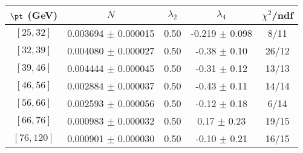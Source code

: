 \begin{tabular}{c||c|c|c|c}
$\pt$ (GeV) & $N$ & $\lambda_{2}$ & $\lambda_4$  & $\chi^2$/ndf  \\
\hline
$[25, 32]$ & 0.003694 $\pm$ 0.000015 & 0.50 & -0.219 $\pm$ 0.098 & 8/11\\
$[32, 39]$ & 0.004080 $\pm$ 0.000027 & 0.50 & -0.38 $\pm$ 0.10 & 26/12\\
$[39, 46]$ & 0.004444 $\pm$ 0.000045 & 0.50 & -0.31 $\pm$ 0.12 & 13/13\\
$[46, 56]$ & 0.002884 $\pm$ 0.000037 & 0.50 & -0.43 $\pm$ 0.11 & 14/14\\
$[56, 66]$ & 0.002593 $\pm$ 0.000056 & 0.50 & -0.12 $\pm$ 0.18 & 6/14\\
$[66, 76]$ & 0.000983 $\pm$ 0.000032 & 0.50 & 0.17 $\pm$ 0.23 & 19/15\\
$[76, 120]$ & 0.000901 $\pm$ 0.000030 & 0.50 & -0.10 $\pm$ 0.21 & 16/15\\
\end{tabular}
